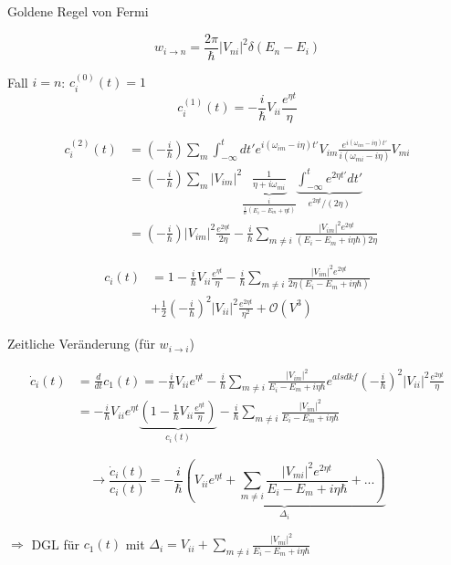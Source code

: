 Goldene Regel von Fermi

\[w_{i\rightarrow n} = \frac{2\pi}{\hbar} |V_{ni}|^2 \delta(E_n-E_i)\]

Fall \(i=n\): \(c^{(0)}_i(t) = 1\)
\[c^{(1)}_i(t) = -\frac{i}{\hbar}V_{ii}\frac{e^{\eta t}}{\eta}\]

\begin{align}
  c^{(2)}_i(t) &= \left(-\frac{i}{\hbar}\right)\sum_m\int_{-\infty}^t dt'e^{i(\omega_{im}-i\eta)t'} V_{im} \frac{e^{i(\omega_{im}-i\eta)t'}}{i(\omega_{mi}-i\eta)}V_{mi} \\
  &=\left(-\frac{i}{\hbar}\right)\sum_m |V_{im}|^2\underbrace{\frac{1}{\eta+i\omega_{mi}}}_{\frac{i}{\frac{i}{\hbar}(E_i-E_m+\eta t)}}\underbrace{\int_{-\infty}^t e^{2\eta t'}dt'}_{e^{2\eta t}/(2\eta)}\\
  &= \left(-\frac{i}{\hbar}\right)|V_{im}|^2 \frac{e^{2\eta t}}{2\eta} -\frac{i}{\hbar}\sum_{m\neq i}\frac{|V_{im}|^2e^{2\eta t}}{(E_i-E_m+i\eta\hbar)2\eta}
\end{align}



\begin{align}
  c_i(t) &= 1-\frac{i}{\hbar} V_{ii}\frac{e^{\eta t}}{\eta} - \frac{i}{\hbar}\sum_{m\neq i}\frac{|V_{im}|^2e^{2\eta t}}{2\eta(E_i-E_m+i\eta\hbar)}\\
  &+\frac{1}{2}\left(-\frac{i}{\hbar}\right)^2|V_{ii}|^2 \frac{e^{2\eta t}}{\eta^2}+\mathcal O(V^3)
\end{align}



Zeitliche Veränderung (für \(w_{i\rightarrow i}\))

\begin{align}
  \dot c_i(t) &= \frac{d}{dt} c_1(t) = -\frac{i}{\hbar}V_{ii} e^{\eta t}-\frac{i}{\hbar}\sum_{m\neq i}\frac{|V_{im}|^2}{E_i-E_m+i\eta\hbar}e^{alsdkf}\left(-\frac{i}{\hbar}\right)^2|V_{ii}|^2\frac{e^{2\eta t}}{\eta}\\
  &= -\frac{i}{\hbar}V_{ii}e^{\eta t}\underbrace{\left(1-\frac{1}{\hbar}V_{ii}\frac{e^{\eta t}}{\eta} \right)}_{c_i(t)}-\frac{i}{\hbar} \sum_{m\neq i}\frac{|V_{im}|^2}{E_i-E_m+i\eta\hbar}
\end{align}


\[\rightarrow \frac{\dot c_i(t)}{c_i(t)} = -\frac{i}{\hbar}\underbrace{(V_{ii}e^{\eta t}+\sum_{m\neq i}\frac{|V_{mi}|^2e^{2\eta t}}{E_i-E_m+i\eta \hbar}+...)}_{\Delta_i}\]

\(\Rightarrow \) DGL für \(c_1(t)\) mit \(\Delta_i = V_{ii}+\sum_{m\neq i}\frac{|V_{mi}|^2}{E_i-E_m+i\eta \hbar}\)

